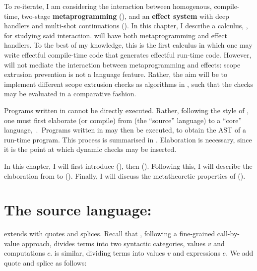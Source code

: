 To re-iterate, I am considering the interaction between homogenous, compile-time, two-stage \textbf{metaprogramming} (), and an \textbf{effect system} with deep handlers and multi-shot continuations (). In this chapter, I describe a calculus, \calculusName{}, for studying said interaction. \calculusName{} will have both metaprogramming and effect handlers. To the best of my knowledge, this is the first calculus in which one may write effectful compile-time code that generates effectful run-time code. However, \calculusName{} will not mediate the interaction between metaprogramming and effects: scope extrusion prevention is not a language feature. Rather, the aim will be to implement different scope extrusion checks as algorithms in \calculusName{}, such that the checks may be evaluated in a comparative fashion. 

Programs written in \calculusName{} cannot be directly executed. Rather, following the style of \citet{xie-2023}, one must first elaborate (or compile) from \calculusName{} (the ``source'' language) to a ``core'' language,\, \coreLang{}.\, Programs written in \coreLang{} may then be executed, to obtain the AST of a run-time program. This process is summarised in . Elaboration is necessary, since it is the point at which dynamic checks may be inserted. 

In this chapter, I will first introduce \sourceLang{} (), then \coreLang{} (). Following this, I will describe the elaboration from \sourceLang{} to \coreLang{} (). Finally, I will discuss the metatheoretic properties of \calculusName{} (). 

\section{The source language: \texorpdfstring{\sourceLang{}}{Lambda-Op-Quote-Splice}}\label{section:source-lang}
\sourceLang{} extends \efflang{} with quotes and splices. Recall that \efflang{}, following a fine-grained call-by-value approach, divides terms into two syntactic categories, values $v$ and computations $c$. \sourceLang{} is similar, dividing terms into values $v$ and expressions $e$. We add quote and splice as follows:

